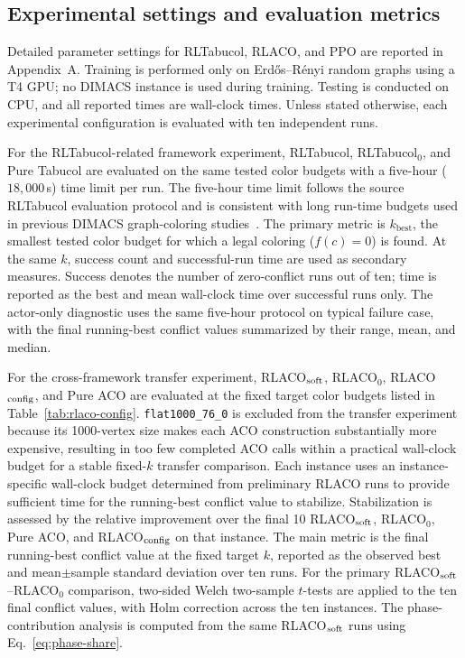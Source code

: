 \subsection{Experimental settings and evaluation metrics}
\label{ssec:exp-settings}

Detailed parameter settings for RLTabucol, RLACO, and PPO are reported
in Appendix~A. Training is performed only on Erd\H{o}s--R\'enyi random
graphs using a T4 GPU; no DIMACS instance is used during training.
Testing is conducted on CPU, and all reported times are wall-clock times.
Unless stated otherwise, each experimental configuration is evaluated
with ten independent runs.

For the RLTabucol-related framework experiment, RLTabucol, RLTabucol$_0$, and
Pure Tabucol are evaluated on the same tested color budgets with a
five-hour ($18{,}000$\,s) time limit per run. The five-hour time limit follows the source RLTabucol evaluation protocol
and is consistent with long run-time budgets used in previous DIMACS
graph-coloring studies~\cite{frijters2023rltabucol,zhou2018plscoll}. The primary metric
is $k_{\mathrm{best}}$, the smallest tested color budget for which a
legal coloring ($f(c)=0$) is found. At the same $k$, success count and
successful-run time are used as secondary measures. Success denotes
the number of zero-conflict runs out of ten; time is reported as the
best and mean wall-clock time over successful runs only. The actor-only
diagnostic uses the same five-hour protocol on
typical failure case, with the final running-best conflict
values summarized by their range, mean, and median.

For the cross-framework transfer experiment, RLACO$_{\rm soft}$,
RLACO$_0$, RLACO$_{\rm config}$, and Pure ACO are evaluated at the
fixed target color budgets listed in Table~\ref{tab:rlaco-config}.
\texttt{flat1000\_76\_0} is excluded from the transfer experiment because its 1000-vertex size makes each ACO construction substantially more
expensive, resulting in too few completed ACO calls within a practical
wall-clock budget for a stable fixed-$k$ transfer comparison. Each instance uses an instance-specific wall-clock budget determined from preliminary RLACO runs to provide sufficient time for the running-best conflict value to stabilize. Stabilization is assessed by the relative improvement over the final 10%
RLACO$_{\rm soft}$, RLACO$_0$, Pure ACO, and RLACO$_{\rm config}$ on that
instance. The main metric is the final running-best conflict
value at the fixed target $k$, reported as the observed best and
mean$\pm$sample standard deviation over ten runs. For the primary
RLACO$_{\rm soft}$--RLACO$_0$ comparison, two-sided Welch
two-sample $t$-tests are applied to the ten final conflict values, with
Holm correction across the ten instances. The phase-contribution
analysis is computed from the same RLACO$_{\rm soft}$ runs using
Eq.~\eqref{eq:phase-share}.

